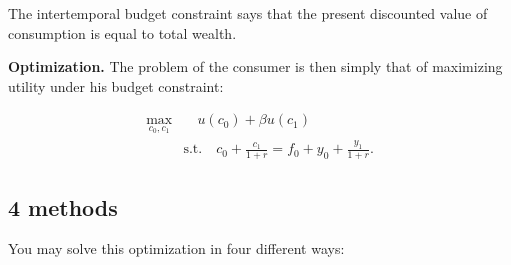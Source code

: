 \documentclass[]{book}
\theoremstyle{definition}
\theoremstyle{definition}
\theoremstyle{definition}
\theoremstyle{remark}
\begin{document}
The intertemporal budget constraint says that the present discounted
value of consumption is equal to total wealth.

\textbf{Optimization.} The problem of the consumer is then simply that
of maximizing utility under his budget constraint:

\[
\begin{aligned} 
\max_{c_{0},c_{1}} & \quad u(c_{0})+\beta u(c_{1}) \\
& \text{s.t.} \quad c_{0}+\frac{c_{1}}{1+r}=f_{0}+y_{0}+\frac{y_{1}}{1+r}.
\end{aligned}
\]

\subsection{4 methods}\label{methods}

You may solve this optimization in four different ways:
\end{document}
